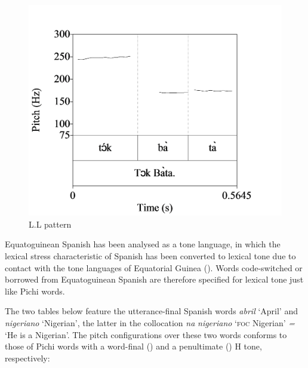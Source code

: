 \begin{figure}
\label{fig:key:3.8}
\caption{L.L pattern}
\includegraphics[height=.3\textheight]{figures/yakpomod-img10.png}
\end{figure}

Equatoguinean Spanish has been analysed as a tone language, in which the lexical stress characteristic of Spanish has been converted to lexical tone due to contact with the tone languages of Equatorial Guinea (\citealt{Lipski2015,SteienYakpo2017}). Words code-switched or borrowed from Equatoguinean Spanish are therefore specified for lexical tone just like Pichi words. 


The two tables below feature the utterance-final Spanish words \textit{abril} ‘April’ and \textit{nigeriano} ‘Nigerian’, the latter in the collocation \textit{na} \textit{nigeriano} ‘\textsc{foc} Nigerian’ \textit{=} ‘He is a Nigerian’. The pitch configurations over these two words conforms to those of Pichi words with a word-final () and a penultimate () H tone, respectively: 


